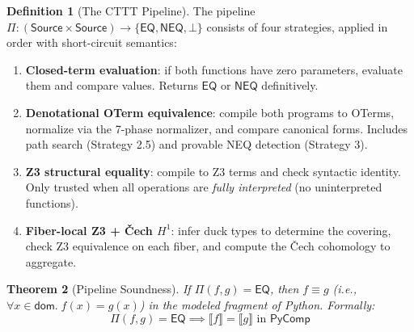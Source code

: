 \documentclass[11pt,a4paper]{report}
\theoremstyle{definition}
\newtheorem{definition}{Definition}[chapter]
\theoremstyle{plain}
\newtheorem{theorem}[definition]{Theorem}
\newcommand{\den}[1]{\llbracket #1 \rrbracket}
\newcommand{\Hone}{H^1}
\begin{document}
\begin{definition}[The CTTT Pipeline]
\label{def:pipeline}
The pipeline $\Pi : (\mathsf{Source} \times \mathsf{Source}) \to
\{\mathsf{EQ}, \mathsf{NEQ}, \bot\}$ consists of four strategies,
applied in order with short-circuit semantics:
\begin{enumerate}
  \item[\textbf{S0.}] \textbf{Closed-term evaluation}: if both
    functions have zero parameters, evaluate them and compare values.
    Returns $\mathsf{EQ}$ or $\mathsf{NEQ}$ definitively.

  \item[\textbf{S1.}] \textbf{Denotational OTerm equivalence}:
    compile both programs to OTerms, normalize via the 7-phase
    normalizer, and compare canonical forms.  Includes path search
    (Strategy 2.5) and provable NEQ detection (Strategy 3).

  \item[\textbf{S2.}] \textbf{Z3 structural equality}: compile to
    Z3 terms and check syntactic identity.  Only trusted when all
    operations are \emph{fully interpreted} (no uninterpreted
    functions).

  \item[\textbf{S3.}] \textbf{Fiber-local Z3 + \v{C}ech $\Hone$}:
    infer duck types to determine the covering, check Z3 equivalence
    on each fiber, and compute the \v{C}ech cohomology to aggregate.
\end{enumerate}
\end{definition}

\begin{theorem}[Pipeline Soundness]
\label{thm:pipeline-sound}
If $\Pi(f, g) = \mathsf{EQ}$, then $f \equiv g$
(i.e., $\forall x \in \mathsf{dom}.\; f(x) = g(x)$)
in the modeled fragment of Python.  Formally:
\[
  \Pi(f, g) = \mathsf{EQ} \implies \den{f} = \den{g} \text{ in }
  \mathsf{PyComp}
\]
\end{theorem}
\end{document}
